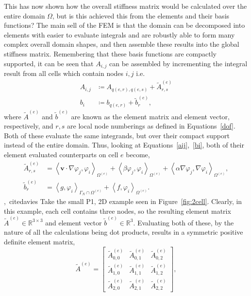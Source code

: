 This has now shown how the overall stiffness matrix would be calculated over the entire domain $\Omega$, but is this achieved this from the elements and their basis functions? The main sell of the FEM is that the domain can be decomposed into elements with easier to evaluate integrals and are robustly able to form many complex overall domain shapes, and then assemble these results into the global stiffness matrix. Remembering that these basis functions are compactly supported, it can be seen that $A_{i,j}$ can be assembled by incrementing the integral result from all cells which contain nodes $i,j$  i.e.
\begin{align}
	A_{i,j} &\coloneqq A_{q(e,r),q(e,s)} + \widetilde{A}_{r,s}^{(e)} \label{aij}\\
	b_i &\coloneqq b_{q(e,r)} + \widetilde{b}_r^{(e)},				\label{bi}
\end{align}
where $\widetilde{A}^{(e)}$ and $\widetilde{b}^{(e)}$ are known as the element matrix and element vector, respectively, and $r,s$ are local node numberings as defined in Equations~\eqref{dof}. Both of these evaluate the same integrands, but over their compact support instead of the entire domain. Thus, looking at Equations~\eqref{aij},~\eqref{bi}, both of their element evaluated counterparts on cell $e$ become,
\begin{align}
	\widetilde{A}_{r,s}^{(e)} &= \left\langle\mathbf{v}\cdot\nabla \varphi_j,\varphi_i\right\rangle_{\Omega^{(e)}} + \left\langle\beta \varphi_j,\varphi_i\right\rangle_{\Omega^{(e)}} + \left\langle\alpha\nabla \varphi_j, \nabla \varphi_i\right\rangle_{\Omega^{(e)}}, \\
	\widetilde{b}_r^{(e)} &= \left\langle g,\varphi_i\right\rangle_{\Gamma_N\cap\Omega^{(e)}} + \left\langle f,\varphi_i\right\rangle_{\Omega^{(e)}}.
\end{align}
\cite{mardal},~cite{davies}
Take the small P1, 2D example seen in Figure~\ref{fig:2cell}. Clearly, in this example, each cell contains three nodes, so the resulting element matrix $\widetilde{A}^{(e)} \in \mathbb{R}^{3\times 3}$ and element vector $\widetilde{b}^{(e)} \in \mathbb{R}^3$. Evaluating both of these, by the nature of all the calculations being dot products, results in a symmetric positive definite element matrix,
\begin{equation}\label{elemmat}
	\widetilde{A}^{(e)} =
	\left[\begin{matrix} 
		\widetilde{A}^{(e)}_{0,0} & \widetilde{A}^{(e)}_{0,1} & \widetilde{A}^{(e)}_{0,2} \\
		\widetilde{A}^{(e)}_{1,0} & \widetilde{A}^{(e)}_{1,1} & \widetilde{A}^{(e)}_{1,2} \\
		\widetilde{A}^{(e)}_{2,0} & \widetilde{A}^{(e)}_{2,1} & \widetilde{A}^{(e)}_{2,2}
	\end{matrix}\right],
\end{equation}
